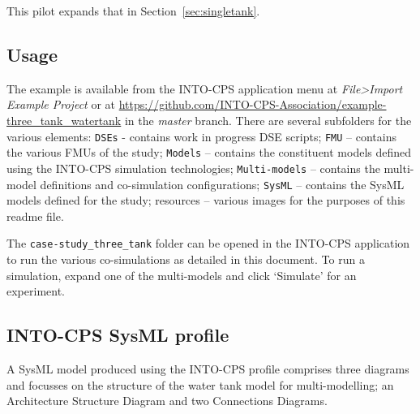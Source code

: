 This pilot expands that in Section~\ref{sec:singletank}.

\subsection{Usage}
\label{sec:threetank_usage}

The example is available from the INTO-CPS application menu at \emph{File>Import Example Project} or at  \url{https://github.com/INTO-CPS-Association/example-three_tank_watertank} in the \emph{master} branch. There are several subfolders for the various elements: \texttt{DSEs} - contains work in progress DSE scripts; \texttt{FMU} -- contains the various FMUs of the study; \texttt{Models} -- contains the constituent models defined using the INTO-CPS simulation technologies; \texttt{Multi-models} -- contains the multi-model definitions and co-simulation configurations; \texttt{SysML} -- contains the SysML models defined for the study; resources -- various images for the purposes of this readme file. 

The \texttt{case-study\_three\_tank} folder can be opened in the INTO-CPS application to run the various co-simulations as detailed in this document. To run a simulation, expand one of the multi-models and click `Simulate' for an experiment. 


%

\subsection{INTO-CPS SysML profile}
\label{sec:threetank_into_sys}

A SysML model produced using the INTO-CPS profile comprises three diagrams and focusses on the structure of the water tank model for multi-modelling; an Architecture Structure Diagram and two Connections Diagrams. 

